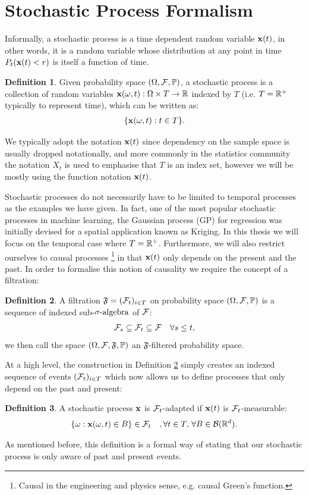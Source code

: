 \documentclass[a4paper,12pt,twoside,openright]{report}
\theoremstyle{definition}
\newtheorem{definition}{Definition}[section]
\begin{document}
\section{Stochastic Process Formalism}
Informally, a stochastic process is a time dependent random variable ${\mathbf{x}}(t)$, in other words, it is a random variable whose distribution at any point in time $P_t({\mathbf{x}}(t) < r)$  is itself a function of time.
\begin{definition}\label{def:stochproc}
Given probability space ${(\Omega, \mathcal{F}, \mathbb{P})}$, a stochastic process is a collection of random variables ${\mathbf{x}}(\omega, t) : \Omega \times T \rightarrow \mathbb{R}$ indexed by $T$ (i.e. $T={\mathbb{R}}^{+}$ typically to represent time), which can be written as:
\begin{align*}
    \{{\mathbf{x}}(\omega, t) : t \in T\}.
\end{align*}
\end{definition}
We typically adopt the notation ${\mathbf{x}}(t)$ since dependency on the sample space is usually dropped notationally, and more commonly in the statistics community the notation $X_t$ is used to emphasise that $T$ is an index set, however we will be mostly using the function notation ${\mathbf{x}}(t)$. 

Stochastic processes do not necessarily have to be limited to temporal processes as the examples we have given. In fact, one of the most popular stochastic processes in machine learning, the Gaussian process (GP) for regression was initially devised for a spatial application known as Kriging. In this thesis we will focus on the temporal case where $T={\mathbb{R}}^{+}$. Furthermore, we will also restrict ourselves to causal processes \footnote{Causal in the engineering and physics sense, e.g. causal Green's function.} in that ${\mathbf{x}}(t)$ only depends on the present and the past. In order to formalise this notion of causality we require the concept of a filtration: 
\begin{definition}\label{def:filtration}
A filtration $\mathfrak{F} = ({\mathcal{F}}_{t})_{i\in T}$ on probability space ${(\Omega, \mathcal{F}, \mathbb{P})}$ is a sequence of indexed sub-${\sigma\text{-algebra}}$ of ${\mathcal{F}}$:
\begin{align*}
    {\mathcal{F}}_{s} \subseteq {\mathcal{F}}_{t} \subseteq {\mathcal{F}} \quad \forall  s \leq t,
\end{align*}
we then call the space ${(\Omega, \mathcal{F}, \mathfrak{F}, \mathbb{P})}$ an $\mathfrak{F}$-filtered probability space.
\end{definition}
At a high level, the construction in Definition \ref{def:filtration} simply creates an indexed sequence of events $({\mathcal{F}}_{t})_{i\in T}$ which now allows us to define processes that only depend on the past and present:
\begin{definition}\label{def:adapted}
    A stochastic process ${\mathbf{x}}$ is ${\mathcal{F}}_t$-adapted  if ${\mathbf{x}}(t)$ is ${\mathcal{F}}_t$-measurable:
    \begin{align*}
        \{\omega :{\mathbf{x}}(\omega,t) \in B\} \in {\mathcal{F}}_t \quad, \forall t \in T , \,\forall B \in {\mathcal{B}}({\mathbb{R}}^d).
    \end{align*}
\end{definition}
As mentioned before, this definition is a formal way of stating that our stochastic process is only aware of past and present events.
\end{document}

